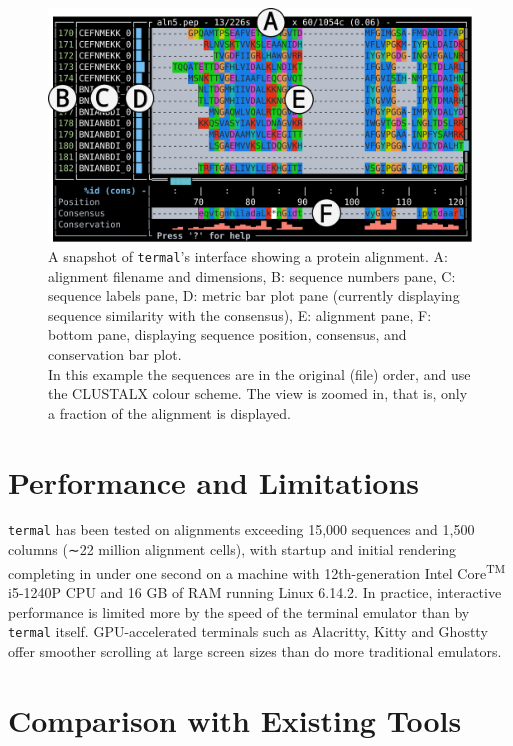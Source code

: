 \documentclass[11pt]{article}
\begin{document}
\begin{figure}[htbp]
\centering
	\includegraphics[width=\textwidth]{figure-1.pdf}
\caption{%
	A snapshot of \texttt{termal}'s interface showing a protein alignment. A:
	alignment filename and dimensions, B: sequence numbers pane, C: sequence
	labels pane, D: metric bar plot pane (currently displaying sequence similarity
	with the consensus), E: alignment pane, F: bottom pane, displaying sequence
	position, consensus, and conservation bar plot. \\
	In this example the sequences are in the original (file) order, and use the
	CLUSTALX colour
scheme. The view is zoomed in, that is, only a fraction of the
	alignment is displayed. }
	\label{fig:screen}
\end{figure}


\section*{Performance and Limitations}

\texttt{termal} has been tested on alignments exceeding 15,000 sequences and
1,500 columns (∼22 million alignment cells), with startup and initial rendering
completing in under one second on a machine with 12th-generation
Intel\textregistered{} Core\textsuperscript{TM} i5-1240P CPU and 16 GB of RAM
running Linux 6.14.2. In practice, interactive performance is limited more by
the speed of the terminal emulator than by \texttt{termal} itself.
GPU-accelerated terminals such as Alacritty\cite{alacritty}, Kitty\cite{kitty}
and Ghostty\cite{ghostty} offer smoother scrolling at large screen sizes than do
more traditional emulators.


\section*{Comparison with Existing Tools}
\end{document}
